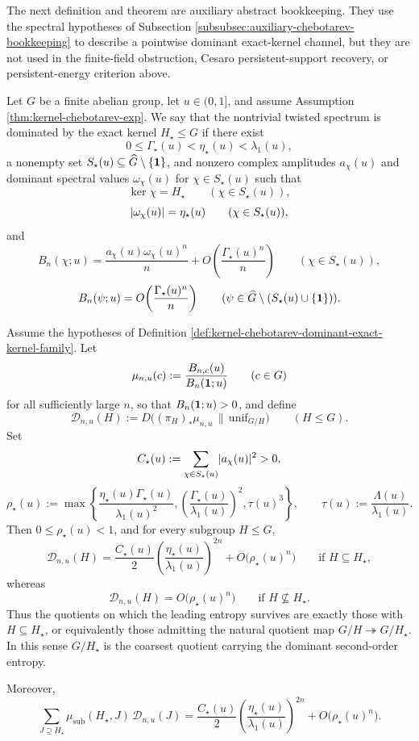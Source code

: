 The next definition and theorem are auxiliary abstract bookkeeping.  They use the spectral hypotheses of Subsection \ref{subsubsec:auxiliary-chebotarev-bookkeeping} to describe a pointwise dominant exact-kernel channel, but they are not used in the finite-field obstruction, Cesaro persistent-support recovery, or persistent-energy criterion above.

\begin{definition}\label{def:kernel-chebotarev-dominant-exact-kernel-family}
Let \(G\) be a finite abelian group, let \(u\in(0,1]\), and assume Assumption \ref{thm:kernel-chebotarev-exp}. We say that the nontrivial twisted spectrum is dominated by the exact kernel \(H_\star\le G\) if there exist
\[
0\le \Gamma_\star(u)<\eta_\star(u)<\lambda_1(u),
\]
a nonempty set \(S_\star(u)\subseteq \widehat G\setminus\{\mathbf{1}\}\), and nonzero complex amplitudes \(a_\chi(u)\) and dominant spectral values \(\omega_\chi(u)\) for \(\chi\in S_\star(u)\) such that
\[
\ker\chi=H_\star
\qquad(\chi\in S_\star(u)),
\]
\[
\lvert \omega_\chi(u)\rvert=\eta_\star(u)
\qquad(\chi\in S_\star(u)),
\]
and
\[
B_n(\chi;u)
=
\frac{a_\chi(u)\omega_\chi(u)^n}{n}
+
O\!\left(\frac{\Gamma_\star(u)^n}{n}\right)
\qquad(\chi\in S_\star(u)),
\]
\[
B_n(\psi;u)
=
O\!\left(\frac{\Gamma_\star(u)^n}{n}\right)
\qquad(\psi\in \widehat G\setminus(S_\star(u)\cup\{\mathbf{1}\})).
\]
\end{definition}

\begin{theorem}\label{thm:kernel-chebotarev-dominant-kernel-detection}
Assume the hypotheses of Definition \ref{def:kernel-chebotarev-dominant-exact-kernel-family}. Let
\[
\mu_{n,u}(c):=\frac{B_{n,c}(u)}{B_n(\mathbf{1};u)}
\qquad(c\in G)
\]
for all sufficiently large \(n\), so that \(B_n(\mathbf{1};u)>0\), and define
\[
\mathcal D_{n,u}(H)
:=
D\!\bigl((\pi_H)_\ast\mu_{n,u}\,\|\,\mathrm{unif}_{G/H}\bigr)
\qquad(H\le G).
\]
Set
\[
C_\star(u):=\sum_{\chi\in S_\star(u)}\lvert a_\chi(u)\rvert^2>0,
\]
\[
\rho_\star(u)
:=
\max\!\left\{
\frac{\eta_\star(u)\Gamma_\star(u)}{\lambda_1(u)^2},
\left(\frac{\Gamma_\star(u)}{\lambda_1(u)}\right)^2,
\tau(u)^3
\right\},
\qquad
\tau(u):=\frac{\Lambda(u)}{\lambda_1(u)}.
\]
Then \(0\le \rho_\star(u)<1\), and for every subgroup \(H\le G\),
\[
\mathcal D_{n,u}(H)
=
\frac{C_\star(u)}{2}
\left(\frac{\eta_\star(u)}{\lambda_1(u)}\right)^{2n}
+
O\!\bigl(\rho_\star(u)^n\bigr)
\qquad\text{if }H\subseteq H_\star,
\]
whereas
\[
\mathcal D_{n,u}(H)=O\!\bigl(\rho_\star(u)^n\bigr)
\qquad\text{if }H\not\subseteq H_\star.
\]
Thus the quotients on which the leading entropy survives are exactly those with \(H\subseteq H_\star\), or equivalently those admitting the natural quotient map \(G/H\twoheadrightarrow G/H_\star\). In this sense \(G/H_\star\) is the coarsest quotient carrying the dominant second-order entropy.

Moreover,
\[
\sum_{J\supseteq H_\star}\mu_{\mathrm{sub}}(H_\star,J)\,\mathcal D_{n,u}(J)
=
\frac{C_\star(u)}{2}
\left(\frac{\eta_\star(u)}{\lambda_1(u)}\right)^{2n}
+
O\!\bigl(\rho_\star(u)^n\bigr).
\]
\end{theorem}

